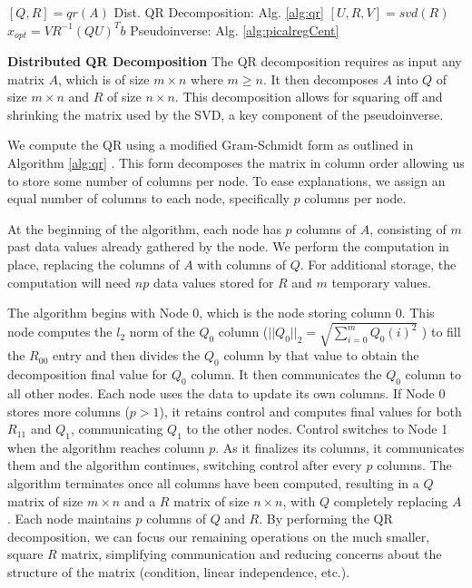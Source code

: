 \documentclass[prodmode,acmtosn]{acmsmall}
\begin{document}
\begin{algorithm}
\caption{Distributed Calibration}\label{alg:distCal}
\begin{algorithmic}
\State $[Q, R] = qr(A)$
\Comment Dist. QR Decomposition: Alg. \ref{alg:qr}
\State $[U,R,V] = svd(R)$
\State $x_{opt}=VR^{-1}(QU)^Tb$
\Comment Pseudoinverse: Alg. \ref{alg:picalregCent}
\end{algorithmic}
\end{algorithm}

{\bf Distributed QR Decomposition}\newline
The QR decomposition requires as input any matrix $A$, which is of size $m \times n$ where $m \geq n$.
It then decomposes $A$ into $Q$ of size $m \times n$ and $R$ of size $n \times n$.
This decomposition allows for squaring off and shrinking the matrix used by the SVD, a key component of the pseudoinverse.

We compute the QR using a modified Gram-Schmidt form as outlined in Algorithm \ref{alg:qr} \cite{golubMatrixBook1996}.
This form decomposes the matrix in column order allowing us to store some number of columns per node.
To ease explanations, we assign an equal number of columns to each node, specifically $p$ columns per node.

At the beginning of the algorithm, each node has $p$ columns of $A$, consisting of $m$ past data values already gathered by the node.
We perform the computation in place, replacing the columns of $A$ with columns of $Q$.
For additional storage, the computation will need $np$ data values stored for $R$ and $m$ temporary values.

The algorithm begins with Node 0, which is the node storing column 0.
This node computes the $l_2$ norm of the $Q_0$ column ($||Q_0||_2 = \sqrt{\sum_{i=0}^{m}{Q_0(i)^2}}$ ) to fill the $R_{00}$ entry and then divides the $Q_0$ column by that value to obtain the decomposition final value for $Q_{0}$ column.
It then communicates the $Q_0$ column to all other nodes.
Each node uses the data to update its own columns.
If Node 0 stores more columns ($p>1$), it retains control and computes final values for both $R_{11}$ and $Q_1$, communicating $Q_1$ to the other nodes.
Control switches to Node 1 when the algorithm reaches column $p$.
As it finalizes its columns, it communicates them and the algorithm continues, switching control after every $p$ columns.
The algorithm terminates once all columns have been computed, resulting in a $Q$ matrix of size $m \times n$ and a $R$ matrix of size $n \times n$, with $Q$ completely replacing $A$.
Each node maintains $p$ columns of $Q$ and $R$.
By performing the QR decomposition, we can focus our remaining operations on the much smaller, square $R$ matrix, simplifying communication and reducing concerns about the structure of the matrix (condition, linear independence, etc.).
\end{document}
